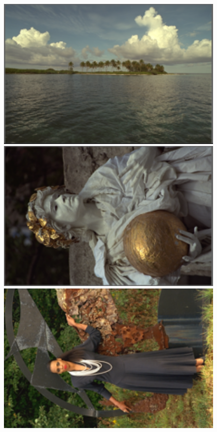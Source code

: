 \documentclass[10pt,twocolumn,letterpaper,sort&compress]{article}
\begin{document}
\begin{figure}
{\begin{minipage}{0.075\textwidth}
\end{minipage}
\begin{minipage}{0.075\textwidth}
\includegraphics[width=1\textwidth]{24images/resize_kodim16.png}
\end{minipage}
\begin{minipage}{0.075\textwidth}
\includegraphics[width=1\textwidth]{24images/resize_kodim17.png}
\end{minipage}
\begin{minipage}{0.075\textwidth}
\includegraphics[width=1\textwidth]{24images/resize_kodim18.png}

\end{minipage}}
\end{figure}
\end{document}

